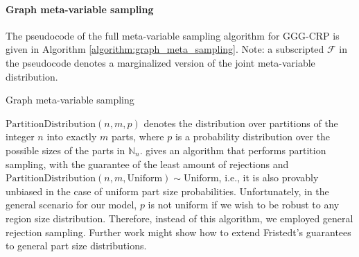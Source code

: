 \paragraph{Graph meta-variable sampling}

The pseudocode of the full meta-variable sampling algorithm for GGG-CRP is given in Algorithm \ref{algorithm:graph_meta_sampling}. Note: a subscripted $\mathcal{F}$ in the pseudocode denotes a marginalized version of the joint meta-variable distribution.
\begin{algorithm}[t!]
\caption{Graph meta-variable sampling}
\label{algorithm:graph_meta_sampling}
\begin{algorithmic}
\ENDFOR
{}
\end{algorithmic}
\end{algorithm} 

$\text{PartitionDistribution}(n,m,p)$ denotes the distribution over partitions of the integer $n$ into exactly $m$ parts, where $p$ is a probability distribution over the possible sizes of the parts in $\mathbb{N}_{n}$. \cite{fristedt_structure_1993} gives an algorithm that performs partition sampling, with the guarantee of the least amount of rejections and $\text{PartitionDistribution}(n,m,\text{Uniform}) \sim \text{Uniform}$, i.e., it is also provably unbiased in the case of uniform part size probabilities. Unfortunately, in the general scenario for our model, $p$ is not uniform if we wish to be robust to any region size distribution. Therefore, instead of this algorithm, we employed general rejection sampling. Further work might show how to extend Fristedt's guarantees to general part size distributions.
    
